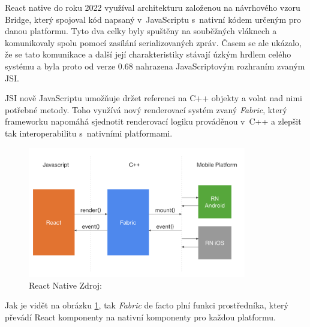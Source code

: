 React native do roku 2022 využíval architekturu založenou na návrhového vzoru Bridge, který spojoval kód napsaný v~JavaScriptu s~nativní kódem určeným pro danou platformu. 
Tyto dva celky byly spuštěny na souběžných vláknech a komunikovaly spolu pomocí zasílání serializovaných zpráv. Časem se ale ukázalo, že se tato komunikace
a další její charakteristiky stávají úzkým hrdlem celého systému a byla proto od verze 0.68 nahrazena JavaScriptovým rozhraním zvaným JSI. \cite{reactNativeAboutNewArch}

JSI nově JavaScriptu umožňuje držet referenci na C++ objekty a volat nad nimi potřebné metody. \cite{reactNativeAboutNewArch} Toho využívá nový renderovací systém zvaný \textit{Fabric}, který 
frameworku napomáhá sjednotit renderovací logiku prováděnou v~C++ a zlepšit tak interoperabilitu s~nativními platformami.

\begin{figure}[H]
  \centering
  \includegraphics[width=0.85\textwidth]{react-natice-xplat-implementation-diagram.png}
  \caption{React Native Zdroj: \cite{imgReactNative} }
  \label{fig:react-natice-xplat-implementation-diagram}
\end{figure}





Jak je vidět na obrázku \ref{fig:react-natice-xplat-implementation-diagram}, tak \textit{Fabric} de facto plní funkci prostředníka, který převádí React 
komponenty na nativní komponenty pro každou platformu. 


